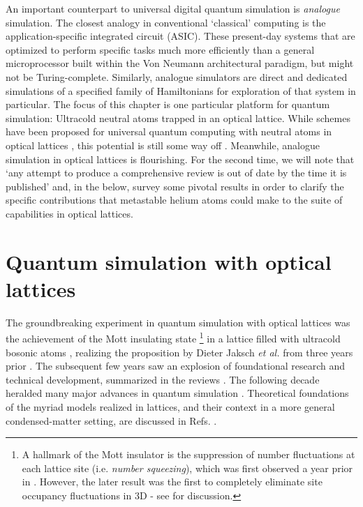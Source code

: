 	An important counterpart to universal digital quantum simulation is \emph{analogue} simulation.
	The closest analogy in conventional `classical' computing is the application-specific integrated circuit (ASIC).
	These present-day systems that are optimized to perform specific tasks much more efficiently than a general microprocessor built within the Von Neumann architectural paradigm, but might not be Turing-complete.
	Similarly, analogue simulators are direct and dedicated simulations of a specified family of Hamiltonians for exploration of that system in particular.
	The focus of this chapter is one particular platform for quantum simulation: Ultracold neutral atoms trapped in an optical lattice. 
	While schemes have been proposed for universal quantum computing with neutral atoms in optical lattices \cite{Brennen99,Henriet20}, this potential is still some way off \cite{Markov00}.
	Meanwhile, analogue simulation in optical lattices is flourishing.
	For the second time, we will note that `any attempt to produce a comprehensive review is out of date by the time it is published' and, in the below, survey some pivotal results in order to clarify the specific contributions that metastable helium atoms could make to the suite of capabilities in optical lattices.



\section{Quantum simulation with optical lattices}


	The groundbreaking experiment in quantum simulation with optical lattices was the achievement of the Mott insulating state \footnote{A hallmark of the Mott insulator is the suppression of number fluctuations at each lattice site (i.e.
	\emph{number squeezing}), which was first observed a year prior in \cite{Orzel01}.
	However, the later result was the first to completely eliminate site occupancy fluctuations in 3D - see \cite{Morsch06} for discussion.} in a lattice filled with ultracold bosonic atoms \cite{Greiner01}, realizing the proposition by Dieter Jaksch \emph{et al.} from three years prior \cite{Jaksch98}.
	The subsequent few years saw an explosion of foundational research and technical development, summarized in the reviews \cite{Morsch06,Bloch08}. 
	The following decade heralded many major advances in quantum simulation \cite{Bloch12,Gross17}.
	Theoretical foundations of the myriad models realized in lattices, and their context in a more general condensed-matter setting, are discussed in Refs. \cite{LewensteinLattices, Lewenstein07}.


